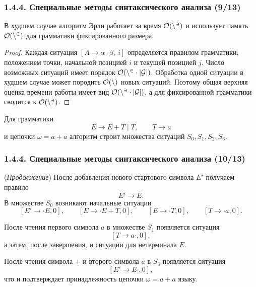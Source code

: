 \begin{frame}
\frametitle{1.4.4. Специальные методы синтаксического анализа (9/13)}

\begin{theorem}[О сложности]
В худшем случае алгоритм Эрли работает за время $\cal O(n^3)$ и использует память
$\cal O(n^2)$ для грамматики фиксированного размера.
\end{theorem}

\begin{proof}
Каждая ситуация $[A \to \alpha \cdot \beta,\ i]$ определяется правилом грамматики,
положением точки, начальной позицией $i$ и текущей позицией $j$. Число возможных
ситуаций имеет порядок $\cal O(n^2\cdot |G|)$. Обработка одной ситуации в худшем
случае может породить $\cal O(n)$ новых ситуаций. Поэтому общая верхняя оценка
времени работы имеет вид $\cal O(n^3\cdot |G|)$, а для фиксированной грамматики
сводится к $\cal O(n^3)$.
\end{proof}

\begin{example}
Для грамматики
\[
E \to E + T \mid T,\qquad T \to a
\]
и цепочки $\omega=a+a$ алгоритм строит множества ситуаций
$S_0,S_1,S_2,S_3$.
\end{example}
\end{frame}

\begin{frame}
\frametitle{1.4.4. Специальные методы синтаксического анализа (10/13)}

\begin{example}
(\textit{Продолжение})
После добавления нового стартового символа $E'$ получаем правило
\[
E' \to E.
\]
В множестве $S_0$ возникают начальные ситуации
\[
[E' \to \cdot E,0],\qquad
[E \to \cdot E+T,0],\qquad
[E \to \cdot T,0],\qquad
[T \to \cdot a,0].
\]

После чтения первого символа $a$ в множестве $S_1$ появляется ситуация
\[
[T \to a \cdot,0],
\]
а затем, после завершения, и ситуации для нетерминала $E$.

После чтения символа $+$ и второго символа $a$ в $S_3$ появляется ситуация
\[
[E' \to E \cdot,0],
\]
что и подтверждает принадлежность цепочки $\omega=a+a$ языку.
\end{example}
\end{frame}

